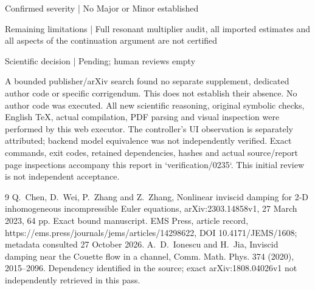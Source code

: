 \documentclass[10pt]{article}
\begin{document}
Confirmed severity | No Major or Minor established\par
Remaining limitations | Full resonant multiplier audit, all imported estimates and all aspects of the continuation argument are not certified\par
Scientific decision | Pending; human reviews empty\par
A bounded publisher/arXiv search found no separate supplement, dedicated author code or specific corrigendum. This does not establish their absence. No author code was executed. All new scientific reasoning, original symbolic checks, English TeX, actual compilation, PDF parsing and visual inspection were performed by this web executor. The controller’s UI observation is separately attributed; backend model equivalence was not independently verified. Exact commands, exit codes, retained dependencies, hashes and actual source/report page inspections accompany this report in `verification/0235`. This initial review is not independent acceptance.\par
9 Q. Chen, D. Wei, P. Zhang and Z. Zhang, Nonlinear inviscid damping for 2-D inhomogeneous incompressible Euler equations, arXiv:2303.14858v1, 27 March 2023, 64 pp. Exact bound manuscript. EMS Press, article record, https://ems.press/journals/jems/articles/14298622, DOI 10.4171/JEMS/1608; metadata consulted 27 October 2026. A. D. Ionescu and H. Jia, Inviscid damping near the Couette flow in a channel, Comm. Math. Phys. 374 (2020), 2015–2096. Dependency identified in the source; exact arXiv:1808.04026v1 not independently retrieved in this pass.\par
\end{document}
